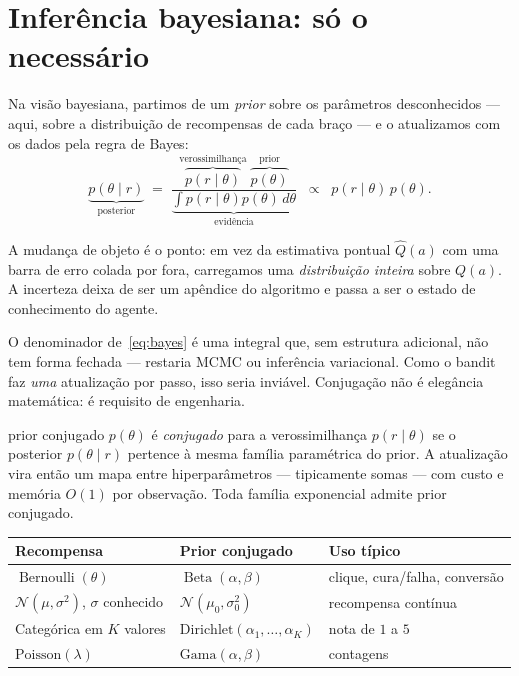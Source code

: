 \documentclass[11pt, a4paper]{article}
\newcommand{\Bdist}{\operatorname{Beta}}
\newcommand{\Bern}{\operatorname{Bernoulli}}
\newcommand{\Nrm}{\mathcal{N}}
\begin{document}
\section{Inferência bayesiana: só o necessário}

Na visão bayesiana, partimos de um \emph{prior} sobre os parâmetros
desconhecidos — aqui, sobre a distribuição de recompensas de cada braço — e o
atualizamos com os dados pela regra de Bayes:
\begin{equation}
  \underbrace{p(\theta \mid r)}_{\text{posterior}}
  \;=\;
  \frac{\overbrace{p(r \mid \theta)}^{\text{verossimilhança}}\;
        \overbrace{p(\theta)}^{\text{prior}}}
       {\underbrace{\int p(r\mid\theta)p(\theta)\,d\theta}_{\text{evidência}}}
  \;\;\propto\;\; p(r \mid \theta)\,p(\theta).
  \label{eq:bayes}
\end{equation}

A mudança de objeto é o ponto: em vez da estimativa pontual $\hat{Q}(a)$ com uma
barra de erro colada por fora, carregamos uma \emph{distribuição inteira} sobre
$Q(a)$. A incerteza deixa de ser um apêndice do algoritmo e passa a ser o estado
de conhecimento do agente.

\begin{alertabox}
O denominador de~\eqref{eq:bayes} é uma integral que, sem estrutura adicional,
não tem forma fechada — restaria MCMC ou inferência variacional. Como o bandit
faz \emph{uma} atualização por passo, isso seria inviável. Conjugação não é
elegância matemática: é requisito de engenharia.
\end{alertabox}

\begin{defbox}{prior conjugado}
$p(\theta)$ é \emph{conjugado} para a verossimilhança $p(r\mid\theta)$ se o
posterior $p(\theta \mid r)$ pertence à mesma família paramétrica do prior. A
atualização vira então um mapa entre hiperparâmetros — tipicamente somas — com
custo e memória $O(1)$ por observação. Toda família exponencial admite prior
conjugado.
\end{defbox}

\begin{center}\small
\begin{tabular}{@{}lll@{}}
\toprule
\textbf{Recompensa} & \textbf{Prior conjugado} & \textbf{Uso típico} \\
\midrule
$\Bern(\theta)$                    & $\Bdist(\alpha,\beta)$ & clique, cura/falha, conversão \\
$\Nrm(\mu,\sigma^2)$, $\sigma$ conhecido & $\Nrm(\mu_0,\sigma_0^2)$ & recompensa contínua \\
Categórica em $K$ valores          & $\mathrm{Dirichlet}(\alpha_1,\ldots,\alpha_K)$ & nota de $1$ a $5$ \\
$\mathrm{Poisson}(\lambda)$        & $\mathrm{Gama}(\alpha,\beta)$ & contagens \\
\bottomrule
\end{tabular}
\end{center}
\end{document}
